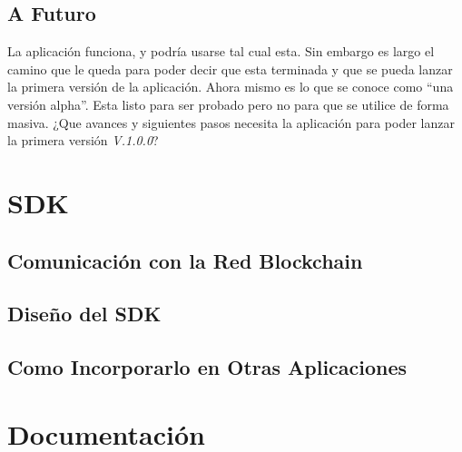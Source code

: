 \subsection{A Futuro}

La aplicación funciona, y podría usarse tal cual esta. Sin embargo es largo el camino que le queda para poder decir que esta terminada y que se pueda lanzar la primera versión de la aplicación. Ahora mismo es lo que se conoce como ``una versión alpha''. Esta listo para ser probado pero no para que se utilice de forma masiva. ¿Que avances y siguientes pasos necesita la aplicación para poder lanzar la primera versión \emph{V.1.0.0}?


\section{SDK} \label{sec:SDK}
\subsection{Comunicación con la Red Blockchain}
\subsection{Diseño del SDK}
\subsection{Como Incorporarlo en Otras Aplicaciones}



\section{Documentación}



